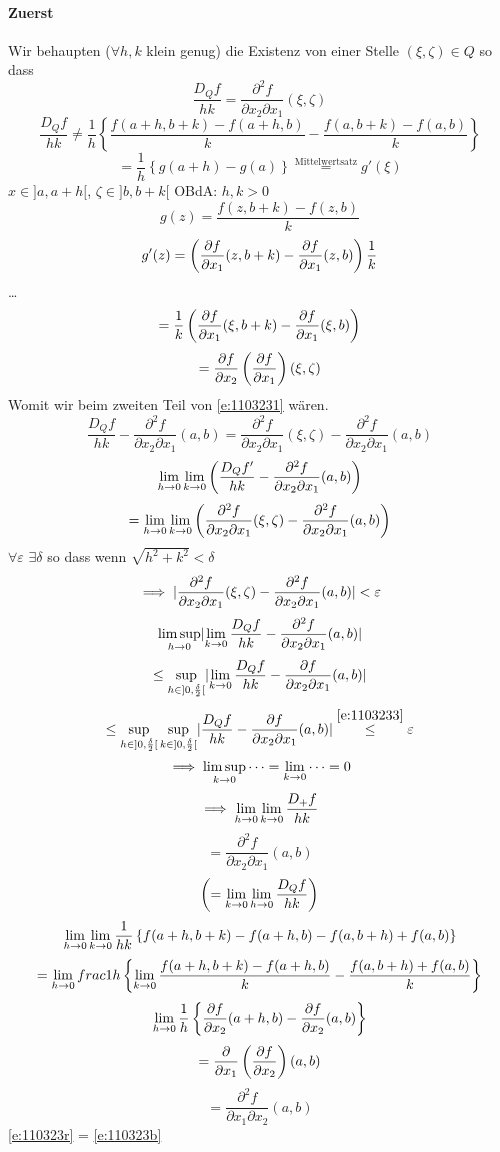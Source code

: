 \begin{Bew}
  \paragraph{Zuerst}
  Wir behaupten ($\forall h,k$ klein genug) die Existenz von einer Stelle $(\xi,\zeta)\in Q$ so dass
  \begin{equation}
    \label{e:1103231}
    \frac{D_Qf}{hk}=\frac{\partial^2f}{\partial x_2\partial x_1}(\xi, \zeta)
  \end{equation}
  \[\frac{D_Qf}{hk}\neq \frac{1}{h}\left\{ \frac{f(a+h,b+k)-f(a+h,b)}{k}-\frac{f(a,b+k)-f(a,b)}{k} \right\}\]
  \[=\frac{1}{h}\left\{ g(a+h)-g(a) \right\}\stackrel{\text{Mittelwertsatz}}{=}g'(\xi)\]
  $x\in ]a,a+h[$, $\zeta\in]b,b+k[$ OBdA: $h,k>0$
  \[g(z)=\frac{f(z,b+k)-f(z,b)}{k}\]
  \[g'(z)=\left( \dfrac{\partial f}{\partial x_1}(z,b+k)-\dfrac{\partial f}{\partial x_1}(z,b) \right)\frac{1}{k}\]
  \ldots
  \[=\frac{1}{k}\left( \dfrac{\partial f}{\partial x_1}(\xi,b+k)-\dfrac{\partial f}{\partial x_1}(\xi,b) \right)\]
  \[=\dfrac{\partial f}{\partial x_2}\left( \dfrac{\partial f}{\partial x_1} \right)(\xi,\zeta)\]
  Womit wir beim zweiten Teil von \ref{e:1103231} wären.
  \[\frac{D_Qf}{hk}-\frac{\partial^2f}{\partial x_2\partial x_1}(a,b)=\frac{\partial^2f}{\partial x_2\partial x_1}(\xi,\zeta)-\frac{\partial^2f}{\partial x_2\partial x_1}(a,b)\]
  \[\displaystyle\lim_{h\rightarrow0}\displaystyle\lim_{k\rightarrow0}\left( \frac{D_Qf'}{hk}-\frac{\partial^2f}{\partial x_2\partial x_1}(a,b) \right)\]
  \[=\displaystyle\lim_{h\rightarrow0}\displaystyle\lim_{k\rightarrow0}\left( \frac{\partial^2f}{\partial x_2\partial x_1}(\xi,\zeta)-\frac{\partial^2 f}{\partial x_2\partial x_1}(a,b) \right)\]
  $\forall \varepsilon$ $\exists \delta$ so dass wenn $\sqrt{h^2+k^2}<\delta$
  \begin{equation}
    \label{e:1103233}
    \implies \mathopen| \frac{\partial^2f}{\partial x_2\partial x_1}(\xi,\zeta)-\frac{\partial^2f}{\partial x_2\partial x_1}(a,b) \mathclose|<\varepsilon
  \end{equation}
  \[\limsup_{h\rightarrow 0}\mathopen| \displaystyle\lim_{k\rightarrow0}\frac{D_Qf}{hk}-\frac{\partial^2 f}{\partial x_2\partial x_1}(a,b) \mathclose|\]
  \[\leq \sup_{h\in ]0,\frac{\delta}{2}[}\mathopen| \displaystyle\lim_{k\rightarrow0}\frac{D_Qf}{hk}-\frac{\partial f}{\partial x_2 \partial x_1}(a,b) \mathclose|\]
  \[\leq \sup_{h\in ]0,\frac{\delta}{2}[}\sup_{k\in ]0,\frac{\delta}{2}[}\mathopen| \frac{D_Qf}{hk}-\frac{\partial f}{\partial x_2 \partial x_1}(a,b) \mathclose|\stackrel{\ref{e:1103233}}{\leq} \varepsilon\]
  \[\implies \limsup_{k\rightarrow 0}\cdots=\displaystyle\lim_{k\rightarrow0}\cdots=0\]
  \[\implies\displaystyle\lim_{h\rightarrow0}\displaystyle\lim_{k\rightarrow0}\frac{D_+f}{hk}\]
  \begin{equation}
    \label{e:110323r}
    =\frac{\partial^2f}{\partial x_2\partial x_1}(a,b)
  \end{equation}
  \[\left( =\displaystyle\lim_{k\rightarrow0}\displaystyle\lim_{h\rightarrow0}\frac{D_Qf}{hk} \right)\]
  \[\displaystyle\lim_{h\rightarrow0}\displaystyle\lim_{k\rightarrow0}\frac{1}{hk}\left\{ f(a+h,b+k)-f(a+h,b)-f(a,b+h)+f(a,b) \right\}\]
  \[=\displaystyle\lim_{h\rightarrow0}\\frac{1}{h}\left\{ \displaystyle\lim_{k\rightarrow0} \frac{f(a+h,b+k)-f(a+h,b)}{k}-\frac{f(a,b+h)+f(a,b)}{k} \right\}\]
  \[\displaystyle\lim_{h\rightarrow0}\frac{1}{h}\left\{ \dfrac{\partial f}{\partial x_2}(a+h,b)-\dfrac{\partial f}{\partial x_2}(a,b) \right\}\]
  \[=\dfrac{\partial }{\partial x_1}\left( \dfrac{\partial f}{\partial x_2} \right)(a,b)\]
  \begin{equation}
    \label{e:110323b}
    =\frac{\partial^2f}{\partial x_1\partial x_2}(a,b)
  \end{equation}
  \ref{e:110323r} = \ref{e:110323b}
\end{Bew}
